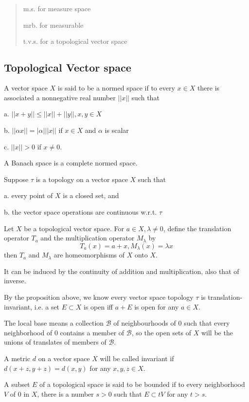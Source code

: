 \chapter{}

\begin{quotation}
m.s. for measure space\par
mrb. for measurable\par
t.v.s. for a topological vector space
\end{quotation}

\section{Topological Vector space}

\begin{definition}
    A vector space $X$ is said to be a normed space if to every $x\in X$ there is associated a nonnegative real number $||x||$ such that\par
    a. $||x+y|| \leq ||x||+||y||, x,y\in X$\par
    b. $||\alpha x|| = |\alpha|||x||$ if $x\in X$ and $\alpha$ is scalar\par
    c. $||x||>0$ if $x\neq 0$.\par
    A Banach space is a complete normed space. 
\end{definition}

\begin{definition}
    Suppose $\tau$ is a topology on a vector space $X$ such that\par
    a. every point of $X$ is a closed set, and\par
    b. the vector space operations are continuous w.r.t. $\tau$
\end{definition}

\begin{proposition}
    Let $X$ be a topological vector space. For $a\in X, \lambda \neq 0$, define the translation operator $T_a$ and the multiplication operator $M_{\lambda}$ by
    \[
    T_a(x) = a+x, M_{\lambda}(x) = \lambda x
    \]
    then $T_a$ and $M_{\lambda}$ are homeomorphisms of $X$ onto $X$.
\end{proposition}
It can be induced by the continuity of addition and multiplication, also that of inverse.

\begin{definition}
    By the proposition above, we know every vector space topology $\tau$ is translation-invariant, i.e. a set $E\subset X$ is open iff $a+E$ is open for any $a\in X$.\par
    The local base means a collection $\mathscr{B}$ of neighbourhoods of $0$ such that every neighborhood of $0$ contains a member of $\mathscr{B}$, so the open sets of $X$ will be the unions of translates of members of $\mathscr{B}$.\par
    A metric $d$ on a vector space $X$ will be called invariant if $d(x+z,y+z) = d(x,y)$ for any $x,y,z\in X$.\par
    A subset $E$ of a topological space is said to be bounded if to every neighborhood $V$ of $0$ in $X$, there is a number $s>0$ such that $E\subset tV$ for any $t>s$.
\end{definition}

